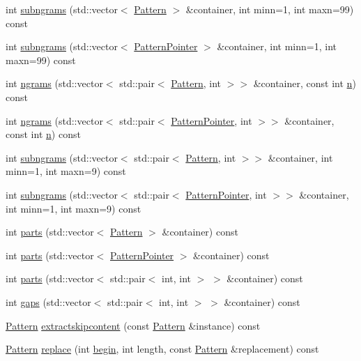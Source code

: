 \begin{DoxyCompactItemize}
int \hyperlink{classPattern_a991dae023a1b507e1f754ad49c31ac88}{subngrams} (std\+::vector$<$ \hyperlink{classPattern}{Pattern} $>$ \&container, int minn=1, int maxn=99) const 
\item 
int \hyperlink{classPattern_af07c1ce51ea00be5df4ea7ab93645ac0}{subngrams} (std\+::vector$<$ \hyperlink{classPatternPointer}{Pattern\+Pointer} $>$ \&container, int minn=1, int maxn=99) const 
\item 
int \hyperlink{classPattern_ad0d0f54adcf6e23070e6761fa1832d3c}{ngrams} (std\+::vector$<$ std\+::pair$<$ \hyperlink{classPattern}{Pattern}, int $>$$>$ \&container, const int \hyperlink{classPattern_a13e66bbb8dd77219255ade5aa5f72c7c}{n}) const 
\item 
int \hyperlink{classPattern_a85c317920a643e765fc51f6f14e2a474}{ngrams} (std\+::vector$<$ std\+::pair$<$ \hyperlink{classPatternPointer}{Pattern\+Pointer}, int $>$$>$ \&container, const int \hyperlink{classPattern_a13e66bbb8dd77219255ade5aa5f72c7c}{n}) const 
\item 
int \hyperlink{classPattern_af74f62b5d7cb9b831025340ff7b62ea4}{subngrams} (std\+::vector$<$ std\+::pair$<$ \hyperlink{classPattern}{Pattern}, int $>$$>$ \&container, int minn=1, int maxn=9) const 
\item 
int \hyperlink{classPattern_af64bc5357eb5c30128e0a4f13243cd2a}{subngrams} (std\+::vector$<$ std\+::pair$<$ \hyperlink{classPatternPointer}{Pattern\+Pointer}, int $>$$>$ \&container, int minn=1, int maxn=9) const 
\item 
int \hyperlink{classPattern_a615d0bd0b135804c993ce0fb027c5491}{parts} (std\+::vector$<$ \hyperlink{classPattern}{Pattern} $>$ \&container) const 
\item 
int \hyperlink{classPattern_a77fcd5463f55ff890139d7c6dee1695b}{parts} (std\+::vector$<$ \hyperlink{classPatternPointer}{Pattern\+Pointer} $>$ \&container) const 
\item 
int \hyperlink{classPattern_acde3a00e476df661b46cc28318e32077}{parts} (std\+::vector$<$ std\+::pair$<$ int, int $>$ $>$ \&container) const 
\item 
int \hyperlink{classPattern_ad4dd286b352c7e5e66dd73233b0d6b29}{gaps} (std\+::vector$<$ std\+::pair$<$ int, int $>$ $>$ \&container) const 
\item 
\hyperlink{classPattern}{Pattern} \hyperlink{classPattern_a5c6f31402871dbac582b22c0c585309c}{extractskipcontent} (const \hyperlink{classPattern}{Pattern} \&instance) const 
\item 
\hyperlink{classPattern}{Pattern} \hyperlink{classPattern_afab002bc06207214e84ff324becfe224}{replace} (int \hyperlink{benchmarks_8cpp_ac7fa37beaab207886901b58632083209}{begin}, int length, const \hyperlink{classPattern}{Pattern} \&replacement) const 

\end{DoxyCompactItemize}
